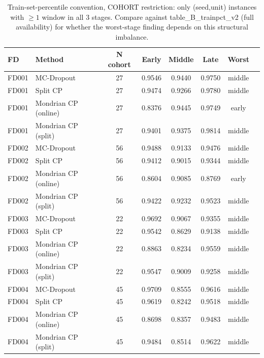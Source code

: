 \begin{table}[t]
\caption{Train-set-percentile convention, COHORT restriction: only (seed,unit) instances with $\geq 1$ window in all 3 stages. Compare against table\_B\_trainpct\_v2 (full availability) for whether the worst-stage finding depends on this structural imbalance.}
\label{tab:trainpct-cohort}
\centering
\small
\begin{tabular}{llcccccc}
\toprule
FD & Method & N cohort & Early & Middle & Late & Worst \\
\midrule
FD001 & MC-Dropout & 27 & 0.9546 & 0.9440 & 0.9750 & middle \\
FD001 & Split CP & 27 & 0.9474 & 0.9266 & 0.9780 & middle \\
FD001 & Mondrian CP (online) & 27 & 0.8376 & 0.9445 & 0.9749 & early \\
FD001 & Mondrian CP (split) & 27 & 0.9401 & 0.9375 & 0.9814 & middle \\
FD002 & MC-Dropout & 56 & 0.9488 & 0.9133 & 0.9476 & middle \\
FD002 & Split CP & 56 & 0.9412 & 0.9015 & 0.9344 & middle \\
FD002 & Mondrian CP (online) & 56 & 0.8604 & 0.9085 & 0.8769 & early \\
FD002 & Mondrian CP (split) & 56 & 0.9422 & 0.9232 & 0.9523 & middle \\
FD003 & MC-Dropout & 22 & 0.9692 & 0.9067 & 0.9355 & middle \\
FD003 & Split CP & 22 & 0.9542 & 0.8629 & 0.9138 & middle \\
FD003 & Mondrian CP (online) & 22 & 0.8863 & 0.8234 & 0.9559 & middle \\
FD003 & Mondrian CP (split) & 22 & 0.9547 & 0.9009 & 0.9258 & middle \\
FD004 & MC-Dropout & 45 & 0.9709 & 0.8555 & 0.9616 & middle \\
FD004 & Split CP & 45 & 0.9619 & 0.8242 & 0.9518 & middle \\
FD004 & Mondrian CP (online) & 45 & 0.8698 & 0.8357 & 0.9483 & middle \\
FD004 & Mondrian CP (split) & 45 & 0.9484 & 0.8514 & 0.9622 & middle \\
\bottomrule
\end{tabular}
\end{table}

